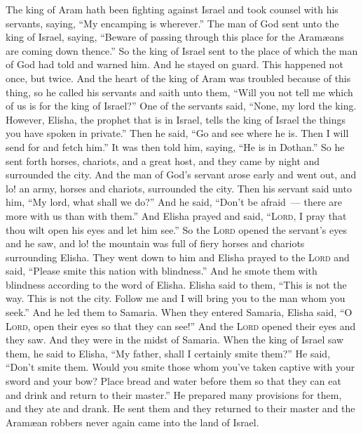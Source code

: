 \begin{inparaenum}
     The king of Aram hath been fighting against Israel and took counsel with his servants, saying, ``My encamping is wherever.''%
     The man of God sent unto the king of Israel, saying, ``Beware of passing through this place for the Aram\ae{}ans are coming down thence.''%
     So the king of Israel sent to the place of which the man of God had told and warned him. And he stayed on guard. This happened not once, but twice.%
     And the heart of the king of Aram was troubled because of this thing, so he called his servants and saith unto them, ``Will you not tell me which of us is for the king of Israel?''%
     One of the servants said, ``None, my lord the king. However, Elisha, the prophet that is in Israel, tells the king of Israel the things you have spoken in private.''%
     Then he said, ``Go and see where he is. Then I will send for and fetch him.'' It was then told him, saying, ``He is in Dothan.''%
     So he sent forth horses, chariots, and a great host, and they came by night and surrounded the city.%
     And the man of God's servant arose early and went out, and lo! an army, horses and chariots, surrounded the city. Then his servant said unto him, ``My lord, what shall we do?''%
     And he said, ``Don't be afraid~--- there are more with us than with them.''%
     And Elisha prayed and said, ``\textsc{Lord}, I pray that thou wilt open his eyes and let him see.'' So the \textsc{Lord} opened the servant's eyes and he saw, and lo! the mountain was full of fiery horses and chariots surrounding Elisha.%
     They went down to him and Elisha prayed to the \textsc{Lord} and said, ``Please smite this nation with blindness.'' And he smote them with blindness according to the word of Elisha.%
     Elisha said to them, ``This is not the way. This is not the city. Follow me and I will bring you to the man whom you seek.'' And he led them to Samaria.%
     When they entered Samaria, Elisha said, ``O \textsc{Lord}, open their eyes so that they can see!'' And the \textsc{Lord} opened their eyes and they saw. And they were in the midst of Samaria.%
     When the king of Israel saw them, he said to Elisha, ``My father, shall I certainly smite them?''%
     He said, ``Don't smite them. Would you smite those whom you've taken captive with your sword and your bow? Place bread and water before them so that they can eat and drink and return to their master.''%
     He prepared many provisions for them, and they ate and drank. He sent them and they returned to their master and the Aram\ae{}an robbers never again came into the land of Israel.%
    

\end{inparaenum}
